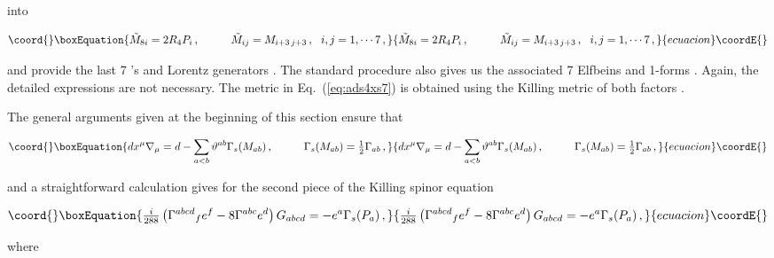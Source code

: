 \documentclass[12pt,a4paper]{article}
\begin{document}
\noindent
into 

\begin{equation}\coord{}\boxEquation{
\tilde{M}_{8i}= 2R_{4}P_{i}\, ,
\hspace{1cm} 
\tilde{M}_{ij}=M_{i+3\, j+3}\, ,
\,\,\,\, i,j=1,\cdots 7\, , 
}{
\tilde{M}_{8i}= 2R_{4}P_{i}\, ,
\hspace{1cm} 
\tilde{M}_{ij}=M_{i+3\, j+3}\, ,
\,\,\,\, i,j=1,\cdots 7\, , 
}{ecuacion}\coordE{}\end{equation}

\noindent 
and provide the last 7 \coordHE{}'s and Lorentz generators \coordHE{}  \coordHE{}. The standard procedure also gives us the associated 7
Elfbeins \coordHE{} and 1-forms \coordHE{}  \coordHE{}. Again,
the detailed expressions are not necessary. The metric in
Eq.~(\ref{eq:ads4xs7}) is obtained using the Killing metric of both
factors \myHighlight{$(+-\cdots -)$}\coordHE{}.

The general arguments given at the beginning of this section ensure that

\begin{equation}\coord{}\boxEquation{
dx^{\mu}\nabla_{\mu} = d - \sum_{a<b}\vartheta^{ab}\Gamma_{s}(M_{ab})\, ,  
\hspace{1cm}
\Gamma_{s}(M_{ab}) ={\textstyle\frac{1}{2}}\Gamma_{ab}\, ,
}{
dx^{\mu}\nabla_{\mu} = d - \sum_{a<b}\vartheta^{ab}\Gamma_{s}(M_{ab})\, ,  
\hspace{1cm}
\Gamma_{s}(M_{ab}) ={\textstyle\frac{1}{2}}\Gamma_{ab}\, ,
}{ecuacion}\coordE{}\end{equation}

\noindent
and a straightforward calculation gives for the second piece
of the Killing spinor equation

\begin{equation}\coord{}\boxEquation{
{\textstyle\frac{i}{288}}\left(\Gamma^{abcd}{}_{f} e^{f}
-8\Gamma^{abc}e^{d} \right)G_{abcd}=
-e^{a}\Gamma_{s}(P_{a})\, ,
}{
{\textstyle\frac{i}{288}}\left(\Gamma^{abcd}{}_{f} e^{f}
-8\Gamma^{abc}e^{d} \right)G_{abcd}=
-e^{a}\Gamma_{s}(P_{a})\, ,
}{ecuacion}\coordE{}\end{equation}

\noindent 
where 
\end{document}
